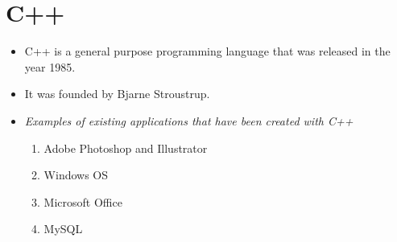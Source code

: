 \documentclass{article}
\begin{document}
	
	\section{C++}
	\begin{itemize}
		\item C++ is a general purpose programming language that was released in the year 1985.
		\item It was founded by Bjarne Stroustrup.
		\item \textit{Examples of existing applications that have been created with C++}
		\begin{enumerate}
			\item Adobe Photoshop and Illustrator
		    \item Windows OS
		    \item Microsoft Office
		    \item MySQL
		\end{enumerate}
	\end{itemize}
\end{document}
